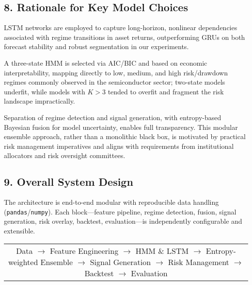 \subsection{8. Rationale for Key Model Choices}

LSTM networks are employed to capture long-horizon, nonlinear dependencies associated with regime transitions in asset returns, outperforming GRUs on both forecast stability and robust segmentation in our experiments.

A three-state HMM is selected via AIC/BIC and based on economic interpretability, mapping directly to low, medium, and high risk/drawdown regimes commonly observed in the semiconductor sector; two-state models underfit, while models with $K > 3$ tended to overfit and fragment the risk landscape impractically.

Separation of regime detection and signal generation, with entropy-based Bayesian fusion for model uncertainty, enables full transparency. This modular ensemble approach, rather than a monolithic black box, is motivated by practical risk management imperatives and aligns with requirements from institutional allocators and risk oversight committees.

\subsection{9. Overall System Design}

The architecture is end-to-end modular with reproducible data handling (\texttt{pandas}/\texttt{numpy}). Each block—feature pipeline, regime detection, fusion, signal generation, risk overlay, backtest, evaluation—is independently configurable and extensible.
\begin{center}
\begin{tabular}{c}
Data $\rightarrow$ Feature Engineering $\rightarrow$ HMM \& LSTM $\rightarrow$ Entropy-weighted Ensemble $\rightarrow$ Signal Generation $\rightarrow$ Risk Management $\rightarrow$ Backtest $\rightarrow$ Evaluation
\end{tabular}
\end{center}
